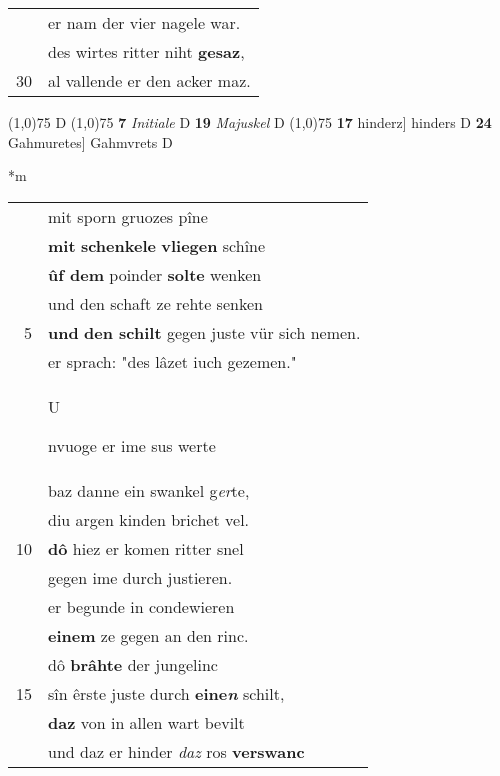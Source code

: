 \documentclass[8pt,a4paper,notitlepage]{article}
\begin{document}
\begin{table}[ht]
\begin{minipage}[t]{0.5\linewidth}
\begin{tabular}{rl}
 & er nam der vier nagele war.\\ 
 & des wirtes ritter niht \textbf{gesaz},\\ 
30 & al vallende er den acker maz.\\ 
\end{tabular}
\scriptsize
\line(1,0){75} \newline
D \newline
\line(1,0){75} \newline
\textbf{7} \textit{Initiale} D  \textbf{19} \textit{Majuskel} D  \newline
\line(1,0){75} \newline
\textbf{17} hinderz] hinders D \textbf{24} Gahmuretes] Gahmvrets D \newline
\end{minipage}
\hspace{0.5cm}
\begin{minipage}[t]{0.5\linewidth}
\small
\begin{center}*m
\end{center}
\begin{tabular}{rl}
 & mit sporn gruozes pîne\\ 
 & \textbf{mit} \textbf{schenkele} \textbf{vliegen} schîne\\ 
 & \textbf{ûf dem} poinder \textbf{solte} wenken\\ 
 & und den schaft ze rehte senken\\ 
5 & \textbf{und} \textbf{den schilt} gegen juste vür sich nemen.\\ 
 & er sprach: "des lâzet iuch gezemen."\\ 
 & \begin{large}U\end{large}nvuoge er ime sus werte\\ 
 & baz danne ein swankel g\textit{er}te,\\ 
 & diu argen kinden brichet vel.\\ 
10 & \textbf{dô} hiez er komen ritter snel\\ 
 & gegen ime durch justieren.\\ 
 & er begunde in condewieren\\ 
 & \textbf{einem} ze gegen an den rinc.\\ 
 & dô \textbf{brâhte} der jungelinc\\ 
15 & sîn êrste juste durch \textbf{eine\textit{n}} schilt,\\ 
 & \textbf{daz} von in allen wart bevilt\\ 
 & und daz er hinder \textit{daz} ros \textbf{verswanc}\\ 

\end{tabular}
\end{minipage}
\end{table}
\end{document}
